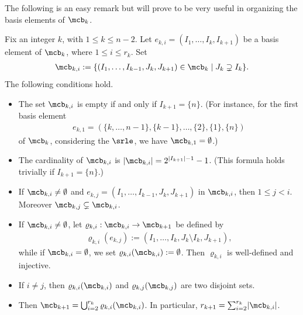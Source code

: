 The following is an easy remark but will prove to be very useful in
organizing the basis elements of $\mcb_k$.

\begin{remark}\label{bki}
Fix an integer $k$, with $1\leq k\leq n-2$. Let $e_{k,i}=(I_1,\ldots
,I_k,I_{k+1})$ be a basis element of $\mcb_k$, where $1\leq i\leq
r_{k}$. Set
\begin{eqnarray*}
\mcb_{k,i}:=\{(I_1,\ldots ,I_{k-1},J_k,J_{k+1})\in\mcb_k\mid
J_k\supsetneq I_k\}.
\end{eqnarray*}
The following conditions hold.
\begin{itemize}
\item[$(a)$] The set $\mcb_{k,i}$ is empty if and only if
  $I_{k+1}=\{n\}$. (For instance, for the first basis element
\begin{eqnarray*}  
e_{k,1}=(\{k,\ldots ,n-1\},\{k-1\},\ldots ,\{2\},\{1\},\{n\})
\end{eqnarray*} 
of $\mcb_k$, considering the $\srle$, we have $\mcb_{k,1}=\emptyset$.)
\item[$(b)$] The cardinality of $\mcb_{k,i}$ is $\lvert
  \mcb_{k,i}\rvert=2^{\lvert I_{k+1}\rvert -1}-1$. (This formula holds
  trivially if $I_{k+1}=\{n\}$.)
\item[$(c)$] If $\mcb_{k,i}\neq \emptyset$ and $e_{k,j}=(I_1,\ldots
  ,I_{k-1},J_k,J_{k+1})$ in $\mcb_{k,i}$, then $1\leq j<i$. Moreover
  $\mcb_{k,j}\subsetneq\mcb_{k,i}$.
\item[$(d)$] If $\mcb_{k,i}\neq \emptyset$, let
  $\varrho_{k,i}:\mcb_{k,i}\to\mcb_{k+1}$ be defined by
\begin{eqnarray*}
\varrho_{k,i}(e_{k,j}):=(I_1,\ldots ,I_k,J_k\setminus I_k,J_{k+1}),
\end{eqnarray*}
while if $\mcb_{k,i}=\emptyset$, we set $\varrho_{k,i}(\mcb_{k,i}):=\emptyset$.
Then $\varrho_{k,i}$ is well-defined and injective.
\item[$(e)$] If $i\neq j$, then $\varrho_{k,i}(\mcb_{k,i})$ and
  $\varrho_{k,j}(\mcb_{k,j})$ are two disjoint sets.
\item[$(f)$] Then $\mcb_{k+1}=\bigcup_{i=2}^{r_k}\varrho_{k,i}(\mcb_{k,i})$.
In particular, $r_{k+1}=\sum_{i=2}^{r_k}\lvert\mcb_{k,i}\rvert$.
\end{itemize}
\end{remark}
